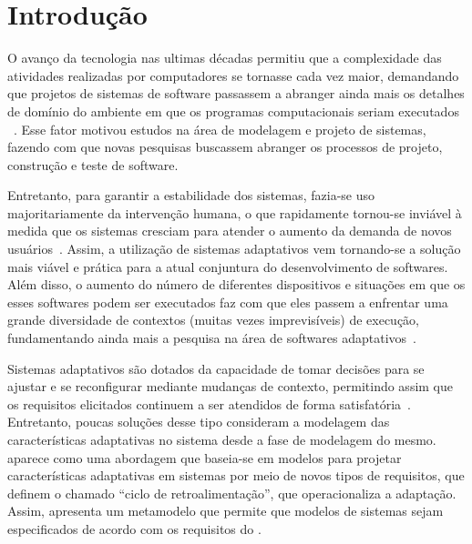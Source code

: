 
\chapter{Introdução}
\label{sec-intro}

O avanço da tecnologia nas ultimas décadas permitiu que a complexidade das atividades realizadas por computadores se tornasse cada vez maior, demandando que projetos de sistemas de software passassem a abranger ainda mais os detalhes de domínio do ambiente em que os programas computacionais seriam executados ~\cite{andersson2009modeling,brun2009engineering}. Esse fator motivou estudos na área de modelagem e projeto de sistemas, fazendo com que novas pesquisas buscassem abranger os processos de projeto, construção e teste de software. 

Entretanto, para garantir a estabilidade dos sistemas, fazia-se uso majoritariamente da intervenção humana, o que rapidamente tornou-se inviável à medida que os sistemas cresciam para atender o aumento da demanda de novos usuários~\cite{andersson2009modeling}. Assim, a utilização de sistemas adaptativos vem tornando-se a solução mais viável e prática para a atual conjuntura do desenvolvimento de softwares. Além disso, o aumento do número de diferentes dispositivos e situações em que os esses softwares podem ser executados faz com que eles passem a enfrentar uma grande diversidade de contextos (muitas vezes imprevisíveis) de execução, fundamentando ainda mais a pesquisa na área de softwares adaptativos~\cite{kephart2003vision}.

Sistemas adaptativos são dotados da capacidade de tomar decisões para se ajustar e se reconfigurar mediante mudanças de contexto, permitindo assim que os requisitos elicitados continuem a ser atendidos de forma satisfatória~\cite{souza2012requirement}. Entretanto, poucas soluções desse tipo consideram a modelagem das características adaptativas no sistema desde a fase de modelagem do mesmo. \zanshin~\cite{tesevitor} aparece como uma abordagem que baseia-se em modelos para projetar características adaptativas em sistemas por meio de novos tipos de requisitos, que definem o chamado ``ciclo de retroalimentação'', que operacionaliza a adaptação. Assim, \zanshin apresenta um metamodelo que permite que modelos de sistemas sejam especificados de acordo com os requisitos do \framework.

